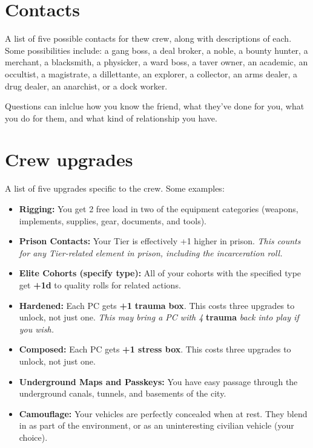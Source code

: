 \documentclass[11pt,oneside]{book}
\newcommand{\gameterm}[1]{\textbf{#1}}
\begin{document}
\section{Contacts}

A list of five possible contacts for thew crew, along with descriptions of each. Some possibilities include: a gang boss, a deal broker, a noble, a bounty hunter, a merchant, a blacksmith, a physicker, a ward boss, a taver owner, an academic, an occultist, a magistrate, a dillettante, an explorer, a collector, an arms dealer, a drug dealer, an anarchist, or a dock worker.

Questions can inlclue how you know the friend, what they’ve done for you,  what you do for them, and what kind of relationship you have.

\section{Crew upgrades}

A list of five upgrades specific to the crew. Some examples:

\begin{itemize}
	\item \textbf{Rigging:} You get 2 free load in two of the equipment categories (weapons, implements, supplies, gear, documents, and tools).
	\item \textbf{Prison Contacts:} Your Tier is effectively +1 higher in prison. \emph{This counts for any Tier-related element in prison, including the incarceration roll.}
	\item \textbf{Elite Cohorts (specify type):} All of your cohorts with the specified type get \textbf{+1d} to quality rolls for related actions.
	\item \textbf{Hardened:} Each PC gets \textbf{+1 }\gameterm{trauma} \textbf{ box}. This costs three upgrades to unlock, not just one. \emph{This may bring a PC with 4 }\gameterm{trauma} \emph{ back into play if you wish.}
	\item \textbf{Composed:} Each PC gets \textbf{+1 stress box}. This costs three upgrades to unlock, not just one.
	\item \textbf{Underground Maps and Passkeys:} You have easy passage through the underground canals, tunnels, and basements of the city.
	\item \textbf{Camouflage:} Your vehicles are perfectly concealed when at rest. They blend in as part of the environment, or as an uninteresting civilian vehicle (your choice).
\end{itemize}
\end{document}
